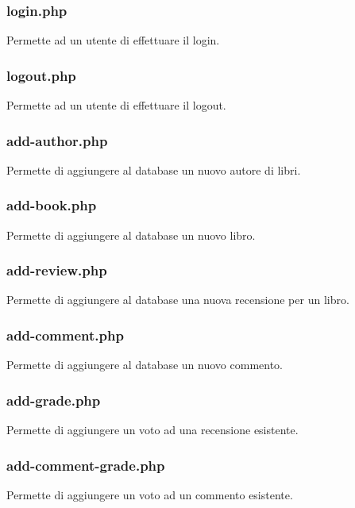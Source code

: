 \documentclass[italian]{article}
\begin{document}
\subsubsection{login.php}
Permette ad un utente di effettuare il login.


\subsubsection{logout.php}
Permette ad un utente di effettuare il logout.


\subsubsection{add-author.php}
Permette di aggiungere al database un nuovo autore di libri.


\subsubsection{add-book.php}
Permette di aggiungere al database un nuovo libro.


\subsubsection{add-review.php}
Permette di aggiungere al database una nuova recensione per un libro.


\subsubsection{add-comment.php}
Permette di aggiungere al database un nuovo commento.


\subsubsection{add-grade.php}
Permette di aggiungere un voto ad una recensione esistente.


\subsubsection{add-comment-grade.php}
Permette di aggiungere un voto ad un commento esistente.

\end{document}
